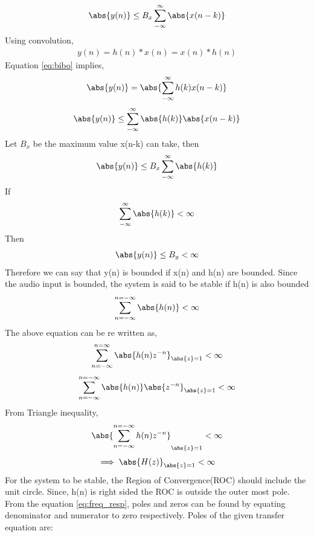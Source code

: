 \documentclass[journal,12pt,twocolumn]{IEEEtran}
\renewcommand\thesection{\arabic{section}}
\begin{document}
\begin{enumerate}[label=\thesection.\arabic*,ref=\thesection.\theenumi]
\begin{equation}
\abs{y(n)} \leq B_{x}\sum_{-\infty}^{\infty} \abs{x(n-k)}
\label{eq:bibo}
\end{equation}
Using convolution,
\begin{align}
y(n)=h(n) * x(n) = x(n) * h(n)
\end{align}
Equation \eqref{eq:bibo} implies,
\begin{equation}
\abs{y(n)} = \abs{\sum_{-\infty}^{\infty} h(k)x(n-k)}
\end{equation}
\begin{equation}
\abs{y(n)} \leq \sum_{-\infty}^{\infty} \abs{h(k)}\abs{x(n-k)}
\end{equation}
Let $B_{x}$ be the maximum value x(n-k) can take, then
\begin{equation}
\abs{y(n)} \leq B_{x}\sum_{-\infty}^{\infty} \abs{h(k)}
\end{equation}
If
\begin{equation}
\sum_{-\infty}^{\infty} \abs{h(k)} < \infty
\end{equation}
Then
\begin{equation}
\abs{y(n)} \leq B_{y} < \infty
\end{equation}
Therefore we can say that y(n) is bounded if x(n) and h(n) are bounded.
Since the audio input is bounded, the system is said to be stable if h(n) is also bounded
\begin{equation}
\sum_{n=-\infty}^{n=-\infty} \abs{h(n)}<\infty
\end{equation}
The above equation can be re written as,
\begin{equation}
\sum_{n=-\infty}^{n=\infty} \abs{h(n)z^{-n}}_{\abs{z}=1}<\infty
\end{equation}
\begin{equation}
\sum_{n=-\infty}^{n=-\infty} \abs{h(n)} \abs{z^{-n}}_{\abs{z}=1}<\infty
\end{equation}
From Triangle inequality,
\begin{equation}
\abs{\sum_{n=-\infty}^{n=-\infty} h(n)z^{-n}}_{\abs{z}=1}<\infty
\end{equation}
\begin{equation}
\implies \abs{H(z)}_{\abs{z}=1} < \infty
\end{equation}
For the system to be stable, the Region of Convergence(ROC) should include the unit circle.
Since, h(n) is right sided the ROC is outside the outer most pole. From the equation \eqref{eq:freq_resp}, poles and zeros can be found by equating denominator and numerator to zero respectively.
Poles of the given transfer equation are:
\begin{equation}

\end{equation}
\end{enumerate}
\end{document}
